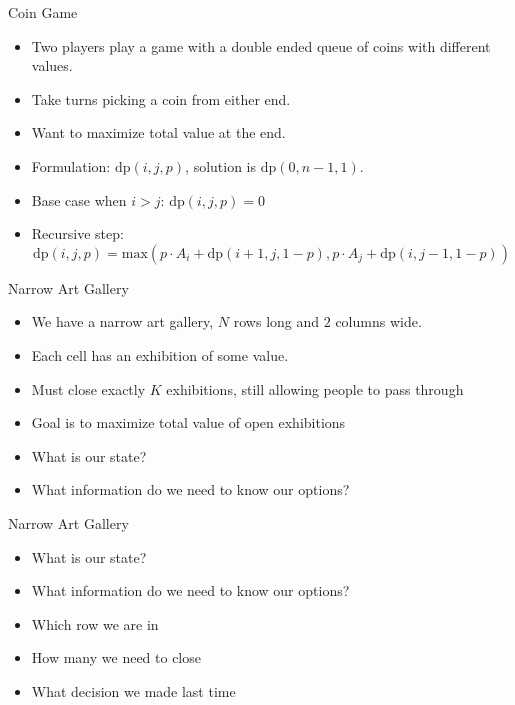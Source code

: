 \documentclass{beamer}
\begin{document}
\begin{frame}[plain]{Coin Game}
    \begin{itemize}
        \item<1-> Two players play a game with a double ended queue of coins with different values.
        \item<1-> Take turns picking a coin from either end.
        \item<1-> Want to maximize total value at the end.
        \item<2-> Formulation: $\mathrm{dp}(i, j, p)$, solution is $\mathrm{dp}(0, n-1, 1)$.
        \item<2-> Base case when $i > j$: $\mathrm{dp}(i, j, p) = 0$
        \item<2-> Recursive step: \[
                \scriptstyle{\mathrm{dp}(i, j, p) = \mathrm{max}\left(p \cdot A_i + \mathrm{dp}(i+1, j, 1-p), p \cdot A_j + \mathrm{dp}(i, j-1, 1-p)\right)}
            \]
    \end{itemize}
\end{frame}

\begin{frame}[plain]{Narrow Art Gallery}
    \begin{itemize}
        \item We have a narrow art gallery, $N$ rows long and $2$ columns wide.
        \item Each cell has an exhibition of some value.
        \item Must close exactly $K$ exhibitions, still allowing people to pass through
        \item Goal is to maximize total value of open exhibitions
        \item What is our state?
        \item What information do we need to know our options?
    \end{itemize}
\end{frame}

\begin{frame}[plain]{Narrow Art Gallery}
    \begin{itemize}
        \item<1-> What is our state?
        \item<1-> What information do we need to know our options?
        \item<2-> Which row we are in
        \item<3-> How many we need to close
        \item<4-> What decision we made last time
    \end{itemize}
\end{frame}
\end{document}
